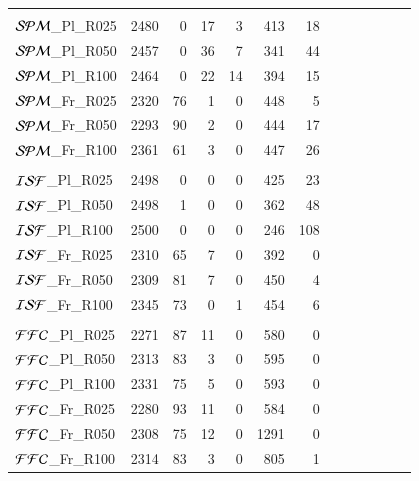 \documentclass[submission,phys]{lib/SciPost}
\begin{document}
\begin{table}
\begin{tabular}{lrrrrrrrrrrrr}
 \hline
  \hline \vspace{-0.75em}\\
${\cal SPM}$\_Pl\_R025 &  2480 & 0 & 17 & 3 & 413 & 18 \\
${\cal SPM}$\_Pl\_R050 &  2457 & 0 & 36 & 7 & 341 & 44 \\
${\cal SPM}$\_Pl\_R100 &  2464 & 0 & 22 & 14 & 394 & 15 \\
${\cal SPM}$\_Fr\_R025 &  2320 & 76 & 1 & 0 & 448 & 5 \\ 
${\cal SPM}$\_Fr\_R050 &  2293 & 90 & 2 & 0 & 444 & 17 \\
${\cal SPM}$\_Fr\_R100 &  2361 & 61 & 3 & 0 & 447 & 26 \\
  \hline
  \hline \vspace{-0.75em}\\
${\cal ISF}$\_Pl\_R025 &  2498 & 0 & 0 & 0 & 425 & 23 \\
${\cal ISF}$\_Pl\_R050 &  2498 & 1 & 0 & 0 & 362 & 48 \\
${\cal ISF}$\_Pl\_R100 &  2500 & 0 & 0 & 0 & 246 & 108 \\
${\cal ISF}$\_Fr\_R025 &  2310 & 65 & 7 & 0 & 392 & 0 \\
${\cal ISF}$\_Fr\_R050 &  2309 & 81 & 7 & 0 & 450 & 4 \\
${\cal ISF}$\_Fr\_R100 &  2345 & 73 & 0 & 1 & 454 & 6 \\
  \hline
  \hline \vspace{-0.75em}\\
${\cal FFC}$\_Pl\_R025 &  2271 & 87 & 11 & 0 & 580 & 0 \\
${\cal FFC}$\_Pl\_R050 &  2313 & 83 & 3 & 0 & 595 & 0 \\
${\cal FFC}$\_Pl\_R100 &  2331 & 75 & 5 & 0 & 593 & 0 \\
${\cal FFC}$\_Fr\_R025 &  2280 & 93 & 11 & 0 & 584 & 0 \\
${\cal FFC}$\_Fr\_R050 &  2308 & 75 & 12 & 0 & 1291 & 0 \\
${\cal FFC}$\_Fr\_R100 &  2314 & 83 & 3 & 0 & 805 & 1 \\
  \hline
 \end{tabular}
\end{table}
\end{document}

